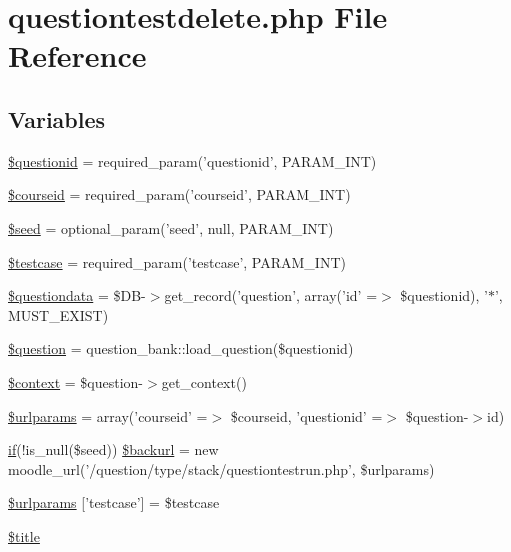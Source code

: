 \hypertarget{questiontestdelete_8php}{
\section{questiontestdelete.php File Reference}
\label{questiontestdelete_8php}
}
\subsection*{Variables}
\begin{DoxyCompactItemize}
\item 
\hyperlink{questiontestdelete_8php_a0b8a9e6194c5b1ca51e0f19a198c19d8}{\$questionid} = required\_\-param('questionid', PARAM\_\-INT)
\item 
\hyperlink{questiontestdelete_8php_a2a1b481ca3e5ae5c2d7a66d271302f23}{\$courseid} = required\_\-param('courseid', PARAM\_\-INT)
\item 
\hyperlink{questiontestdelete_8php_a4aea6700edf05cf13c65dc0e758c9ad3}{\$seed} = optional\_\-param('seed', null, PARAM\_\-INT)
\item 
\hyperlink{questiontestdelete_8php_ae640ef9490b2598569406e3654f480b6}{\$testcase} = required\_\-param('testcase', PARAM\_\-INT)
\item 
\hyperlink{questiontestdelete_8php_ab3dbd2b3f38fc871b3aba59ed0657c55}{\$questiondata} = \$DB-\/$>$get\_\-record('question', array('id' =$>$ \$questionid), '$\ast$', MUST\_\-EXIST)
\item 
\hyperlink{questiontestdelete_8php_acf0d1ba8b3999333306bf1a4fd363e93}{\$question} = question\_\-bank::load\_\-question(\$questionid)
\item 
\hyperlink{questiontestdelete_8php_ae05dedb802ada0155efdece2044fed64}{\$context} = \$question-\/$>$get\_\-context()
\item 
\hyperlink{questiontestdelete_8php_a1aa950c4029aca228dd33a4b27109e00}{\$urlparams} = array('courseid' =$>$ \$courseid, 'questionid' =$>$ \$question-\/$>$id)
\item 
\hyperlink{caschat_8php_a2018ad56dfaea89ba7f32f4f912be98f}{if}(!is\_\-null(\$seed)) \hyperlink{questiontestdelete_8php_a28d8c96a7ddca2daae7a03f1567d1c3a}{\$backurl} = new moodle\_\-url('/question/type/stack/questiontestrun.php', \$urlparams)
\item 
\hyperlink{questiontestdelete_8php_a0ebc1f55faa70ed8b77a39b4d6f88d03}{\$urlparams} \mbox{[}'testcase'\mbox{]} = \$testcase
\item 
\hyperlink{questiontestdelete_8php_ada57e7bb7c152edad18fe2f166188691}{\$title}
\end{DoxyCompactItemize}


